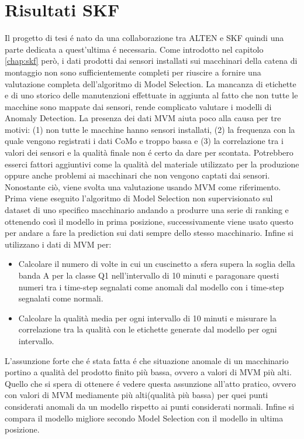 \section{Risultati SKF}
Il progetto di tesi é nato da una collaborazione tra ALTEN e SKF quindi una parte dedicata a quest'ultima é necessaria. Come introdotto nel capitolo \ref{chap:skf} però, i dati prodotti dai sensori installati sui macchinari della catena di montaggio non sono sufficientemente completi per riuscire a fornire una valutazione completa dell'algoritmo di Model Selection. La mancanza di etichette e di uno storico delle manutenzioni effettuate in aggiunta al fatto che non tutte le macchine sono mappate dai sensori, rende complicato valutare i modelli di Anomaly Detection. La presenza dei dati MVM aiuta poco alla causa per tre motivi: (1) non tutte le macchine hanno sensori installati, (2) la frequenza con la quale vengono registrati i dati CoMo e troppo bassa e (3) la correlazione tra i valori dei sensori e la qualità finale non é certo da dare per scontata. Potrebbero esserci fattori aggiuntivi come la qualità del materiale utilizzato per la produzione oppure anche problemi ai macchinari che non vengono captati dai sensori. 
Nonostante ciò, viene svolta una valutazione usando MVM come riferimento. Prima viene eseguito l'algoritmo di Model Selection non supervisionato sul dataset di uno specifico macchinario andando a produrre una serie di ranking e ottenendo così il modello in prima posizione, successivamente viene usato questo per andare a fare la prediction sui dati sempre dello stesso macchinario. Infine si utilizzano i dati di MVM per:
\begin{itemize}
	\item Calcolare il numero di volte in cui un cuscinetto a sfera supera la soglia della banda A per la classe Q1 nell'intervallo di 10 minuti e paragonare questi numeri tra i time-step segnalati come anomali dal modello con i time-step segnalati come normali.
	\item Calcolare la qualità media per ogni intervallo di 10 minuti e misurare la correlazione tra la qualità con le etichette generate dal modello per ogni intervallo.
\end{itemize}
L'assunzione forte che é stata fatta é che situazione anomale di un macchinario portino a qualità del prodotto finito più bassa, ovvero a valori di MVM più alti. Quello che si spera di ottenere é vedere questa assunzione all'atto pratico, ovvero con valori di MVM mediamente più alti(qualità più bassa) per quei punti considerati anomali da un modello rispetto ai punti considerati normali.
Infine si compara il modello migliore secondo Model Selection con il modello in ultima posizione.

